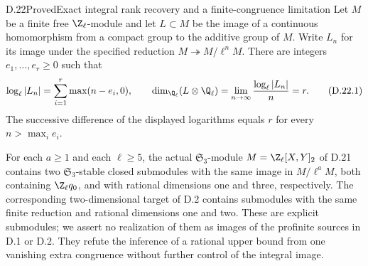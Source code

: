 \begin{statement}{D.22}{Proved}{Exact integral rank recovery and a finite-congruence limitation}
Let $M$ be a finite free $\Z_\ell$-module and let $L\subset M$
be the image of a continuous homomorphism from a compact group
to the additive group of $M$. Write $L_n$ for its image under
the specified reduction $M\twoheadrightarrow M/\ell^nM$.
There are integers $e_1,\ldots,e_r\geq0$ such that
\[
 \log_\ell|L_n|=\sum_{i=1}^r\max(n-e_i,0),\qquad
 \dim_{\Q_\ell}(L\otimes\Q_\ell)
       =\lim_{n\to\infty}\frac{\log_\ell|L_n|}{n}=r.
 \tag{D.22.1}
\]
The successive difference of the displayed logarithms equals
$r$ for every $n>\max_i e_i$.

For each $a\geq1$ and each $\ell\geq5$, the actual
$\mathfrak S_3$-module $M=\Z_\ell[X,Y]_2$ of D.21 contains
two $\mathfrak S_3$-stable closed submodules with the same
image in $M/\ell^aM$, both containing $\Z_\ell q_0$, and
with rational dimensions one and three, respectively.
The corresponding two-dimensional target of D.2 contains
submodules with the same finite reduction and rational
dimensions one and two. These are explicit submodules;
we assert no realization of them as images of the profinite
sources in D.1 or D.2. They refute the inference of a
rational upper bound from one vanishing extra congruence
without further control of the integral image.
\end{statement}

